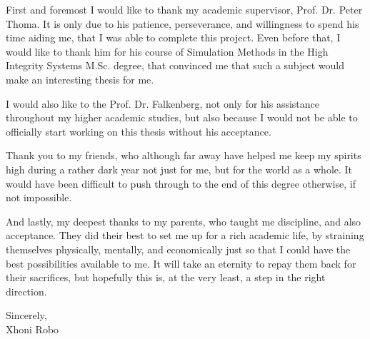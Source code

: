 \documentclass[
12pt, %
oneside, %
english, %
doublespacing, %
parskip, %
headsepline, %
chapterinoneline, %
]{MastersDoctoralThesis} %
\begin{document}
\begin{acknowledgements}
\addchaptertocentry{\acknowledgementname} %
First and foremost I would like to thank my academic supervisor, Prof. Dr. Peter Thoma. It is only due to his patience, perseverance, and willingness to spend his time aiding me, that I was able to complete this project. Even before that, I would like to thank him for his course of Simulation Methods in the High Integrity Systems M.Sc. degree, that convinced me that such a subject would make an interesting thesis for me.

I would also like to the Prof. Dr. Falkenberg, not only for his assistance throughout my higher academic studies, but also because I would not be able to officially start working on this thesis without his acceptance.

Thank you to my friends, who although far away have helped me keep my spirits high during a rather dark year not just for me, but for the world as a whole. It would have been difficult to push through to the end of this degree otherwise, if not impossible.

And lastly, my deepest thanks to my parents, who taught me discipline, and also acceptance. They did their best to set me up for a rich academic life, by straining themselves physically, mentally, and economically just so that I could have the best possibilities available to me. It will take an eternity to repay them back for their sacrifices, but hopefully this is, at the very least, a step in the right direction.

Sincerely,\\
Xhoni Robo
\end{acknowledgements}


\tableofcontents %

\listoffigures %

\listoftables %

\end{document}

